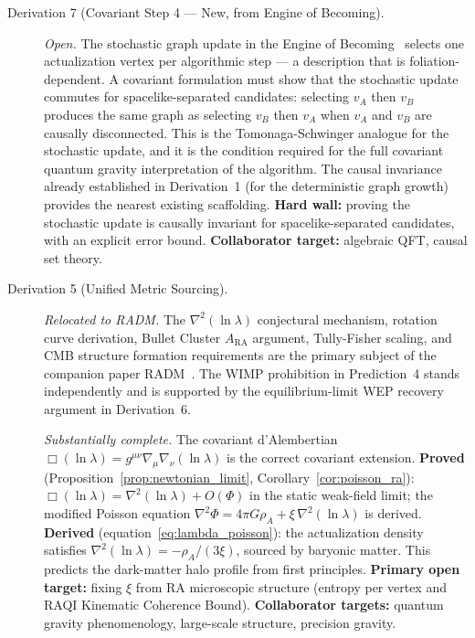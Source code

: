 \documentclass[11pt,a4paper]{article}
\theoremstyle{plain}
\theoremstyle{definition}
\theoremstyle{remark}
\begin{document}
\begin{description}
  \item[Derivation 7 (Covariant Step 4 --- New, from Engine of Becoming).]
  \textit{Open.} The stochastic graph update in the Engine of
  Becoming~\citep{Sandeman2026RAEB} selects one actualization vertex per
  algorithmic step --- a description that is foliation-dependent. A covariant
  formulation must show that the stochastic update commutes for
  spacelike-separated candidates: selecting $v_A$ then $v_B$ produces the same
  graph as selecting $v_B$ then $v_A$ when $v_A$ and $v_B$ are causally
  disconnected. This is the Tomonaga-Schwinger analogue for the stochastic
  update, and it is the condition required for the full covariant quantum
  gravity interpretation of the algorithm. The causal invariance already
  established in Derivation~1 (for the deterministic graph growth) provides the
  nearest existing scaffolding.
  \textbf{Hard wall:} proving the stochastic update is causally invariant for
  spacelike-separated candidates, with an explicit error bound.
  \textbf{Collaborator target:} algebraic QFT, causal set theory.

  \item[Derivation 5 (Unified Metric Sourcing).] \textit{Relocated to RADM.}
  The $\nabla^2(\ln\lambda)$ conjectural mechanism, rotation curve derivation,
  Bullet Cluster $A_{\mathrm{RA}}$ argument, Tully-Fisher scaling, and CMB
  structure formation requirements are the primary subject of the companion paper
  RADM~\citep{Sandeman2026RADM}. The WIMP prohibition in Prediction~4 stands
  independently and is supported by the equilibrium-limit WEP recovery argument
  in Derivation~6.

  \textit{Substantially complete.} The covariant d'Alembertian
  $\Box(\ln\lambda) = g^{\mu\nu}\nabla_\mu\nabla_\nu(\ln\lambda)$ is
  the correct covariant extension.
  \textbf{Proved} (Proposition~\ref{prop:newtonian_limit},
  Corollary~\ref{cor:poisson_ra}): $\Box(\ln\lambda) = \nabla^2(\ln\lambda)
  + O(\Phi)$ in the static weak-field limit; the modified Poisson equation
  $\nabla^2\Phi = 4\pi G\rho_A + \xi\,\nabla^2(\ln\lambda)$ is derived.
  \textbf{Derived} (equation~\eqref{eq:lambda_poisson}): the actualization
  density satisfies $\nabla^2(\ln\lambda) = -\rho_A/(3\xi)$, sourced by
  baryonic matter. This predicts the dark-matter halo profile from
  first principles.
  \textbf{Primary open target:} fixing $\xi$ from RA microscopic
  structure (entropy per vertex and RAQI Kinematic Coherence Bound).
  \textbf{Collaborator targets:} quantum gravity phenomenology,
  large-scale structure, precision gravity.


\end{description}
\end{document}
